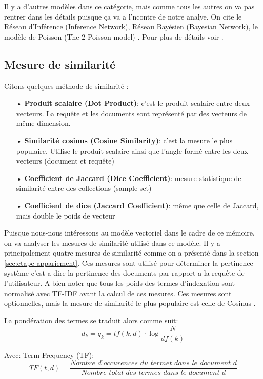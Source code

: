 Il y a d'autres modèles dans ce catégorie, mais comme tous les autres on va pas rentrer dans les détails puisque ça va a l'ncontre de notre analye. On cite le Réseau d'Inférence (Inference Network), Réseau Bayésien (Bayesian Network), le modèle de Poisson (The 2-Poisson model) \citep{model-ir}. Pour plus de détails voir \citep{modern-ir}.

\subsection{Mesure de similarité}
\label{sec:mesure-similarite}
Citons quelques méthode de similarité \citep*{vsm-for-arabic-language, sarch-engine-vsm, vsm}:
\begin{itemize}
    \item[•] \textbf{Produit scalaire (Dot Product)}: c'est le produit scalaire entre deux vecteurs. La requête et les documents sont représenté par des vecteurs de même dimension.
    \item[•] \textbf{Similarité cosinus (Cosine Similarity)}: c'est la mesure le plus populaire. Utilise le produit scalaire ainsi que l'angle formé entre les deux vecteurs (document et requête)
    \item[•] \textbf{Coefficient de Jaccard (Dice Coefficient)}: mesure statistique de similarité entre des collections (sample set)
    \item[•] \textbf{Coefficient de dice (Jaccard Coefficient)}: même que celle de Jaccard, mais double le poids de vecteur
\end{itemize}

Puisque nous-nous intéressons au modèle vectoriel dans le cadre de ce mémoire, on va analyser les mesures de similarité utilisé dans ce modèle. Il y a principalement quatre mesures de similarité comme on a présenté dans la section \ref{sec:etape-appariement}. Ces mesures sont utilisé pour déterminer la pertinence système c'est a dire la pertinence des documents par rapport a la requête de l'utilisateur. A bien noter que tous les poids des termes d'indexation sont normalisé avec TF-IDF avant la calcul de ces mesures. Ces mesures sont optionnelles, mais la mesure de similarité le plus populaire est celle de Cosinus \citep{vsm}.

La pondération des termes se traduit alors comme suit:
\[
    d_{k} = q_{k} = tf(k, d) \cdot \log{\frac{N}{df{(k)}}}
\]

Avec:
Term Frequency (TF):
\[
    TF(t, d) = \frac{\textit{Nombre d'occurences du terme} t \textit{ dans le document } d}{\textit{Nombre total des termes dans le document } d}
\]

